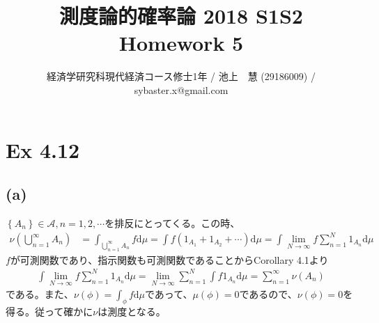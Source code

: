 \documentclass{article}
\begin{document}
\title{測度論的確率論 2018 S1S2 \\ 
Homework 5}
\author{経済学研究科現代経済コース修士1年 / 池上　慧 (29186009) / sybaster.x@gmail.com}
\maketitle

\section{Ex 4.12}
\subsection{(a)}
$\left\{ A_n \right\} \in \mathcal{A}, n = 1,2, \cdots$を排反にとってくる。この時、
\begin{align*}
	\nu \left( \bigcup_{n = 1}^{\infty} A_n \right) &= \int_{\bigcup_{n = 1}^{\infty} A_n} f \mathrm{d}\mu = \int f \left( 1_{A_1} + 1_{A_2} + \cdots \right) \mathrm{d}\mu = \int \lim_{N \to \infty} f \sum_{n = 1}^N 1_{A_n} \mathrm{d}\mu 
\end{align*}
$f$が可測関数であり、指示関数も可測関数であることからCorollary 4.1より
\begin{align*}
	 \int \lim_{N \to \infty} f \sum_{n = 1}^N 1_{A_n} \mathrm{d}\mu = \lim_{N \to \infty} \sum_{n = 1}^N \int f 1_{A_n}\mathrm{d}\mu = \sum_{n = 1}^{\infty} \nu(A_n)
\end{align*}
である。また、$\nu(\phi) = \int_{\phi} f \mathrm{d}\mu$であって、$\mu (\phi) = 0$であるので、$\nu(\phi) = 0$を得る。従って確かに$\nu$は測度となる。
\end{document}
